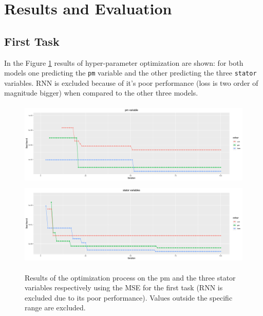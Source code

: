 \section{Results and Evaluation}
 
\subsection{First Task}
In the Figure \ref{fig:automl_mse} results of hyper-parameter optimization are shown: for both models one predicting the \verb|pm| variable and the other predicting the three \verb|stator| variables. RNN is excluded because of it's poor performance (loss is two order of magnitude bigger) when compared to the other three models.
\begin{figure}[!h]
    \centering
    \includegraphics[width=\linewidth, height=4cm]{imgs/comparison_MSE.png}
    \includegraphics[width=\linewidth, height=4cm]{imgs/comparison_MSE_stator.png}
    \caption{Results of the optimization process on the pm and the three stator variables respectively using the MSE for the first task (RNN is excluded due to its poor performance). Values outside the specific range are excluded.}
    \label{fig:automl_mse}
\end{figure}
 
